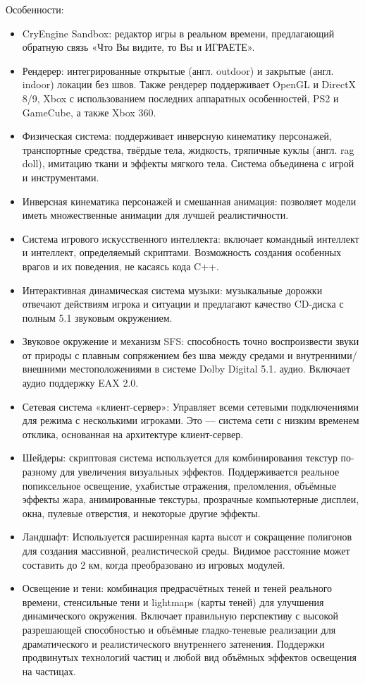 Особенности:
\begin{itemize}
	\item CryEngine Sandbox: редактор игры в реальном времени, предлагающий обратную связь «Что Вы видите, то Вы и ИГРАЕТЕ».
	\item Рендерер: интегрированные открытые (англ. outdoor) и закрытые (англ. indoor) локации без швов. Также рендерер поддерживает OpenGL и DirectX 8/9, Xbox с использованием последних аппаратных особенностей, PS2 и GameCube, а также Xbox 360.
	\item Физическая система: поддерживает инверсную кинематику персонажей, транспортные средства, твёрдые тела, жидкость, тряпичные куклы (англ. rag doll), имитацию ткани и эффекты мягкого тела. Система объединена с игрой и инструментами.
	\item Инверсная кинематика персонажей и смешанная анимация: позволяет модели иметь множественные анимации для лучшей реалистичности.
	\item Система игрового искусственного интеллекта: включает командный интеллект и интеллект, определяемый скриптами. Возможность создания особенных врагов и их поведения, не касаясь кода C++.
	\item Интерактивная динамическая система музыки: музыкальные дорожки отвечают действиям игрока и ситуации и предлагают качество CD-диска с полным 5.1 звуковым окружением.
	\item Звуковое окружение и механизм SFS: способность точно воспроизвести звуки от природы с плавным сопряжением без шва между средами и внутренними/внешними местоположениями в системе Dolby Digital 5.1. аудио. Включает аудио поддержку EAX 2.0.
	\item Сетевая система «клиент-сервер»: Управляет всеми сетевыми подключениями для режима с несколькими игроками. Это — система сети с низким временем отклика, основанная на архитектуре клиент-сервер.
	\item Шейдеры: скриптовая система используется для комбинирования текстур по-разному для увеличения визуальных эффектов. Поддерживается реальное попиксельное освещение, ухабистые отражения, преломления, объёмные эффекты жара, анимированные текстуры, прозрачные компьютерные дисплеи, окна, пулевые отверстия, и некоторые другие эффекты.
	\item Ландшафт: Используется расширенная карта высот и сокращение полигонов для создания массивной, реалистической среды. Видимое расстояние может составить до 2 км, когда преобразовано из игровых модулей.
	\item Освещение и тени: комбинация предрасчётных теней и теней реального времени, стенсильные тени и lightmaps (карты теней) для улучшения динамического окружения. Включает правильную перспективу с высокой разрешающей способностью и объёмные гладко-теневые реализации для драматического и реалистического внутреннего затенения. Поддержки продвинутых технологий частиц и любой вид объёмных эффектов освещения на частицах.

\end{itemize}
